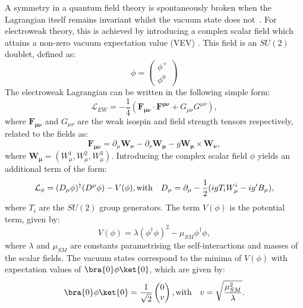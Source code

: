A symmetry in a quantum field theory is spontaneously broken when the Lagrangian
itself remains invariant whilst the vacuum state does
not~\cite{AitchisonGaugeTheories}. For electroweak
theory, this is achieved by introducing a complex scalar field which attains a
non-zero vacuum expectation value (VEV)
\cite{Higgs:1964ia,Higgs:1964pj,Guralnik:1964eu,Higgs:1966ev,Kibble:1967sv}. 
This field is an $SU(2)$ doublet, defined as:
\begin{equation}
\phi = \begin{pmatrix}\phi^{+} \\ \phi^{0} \end{pmatrix}
\end{equation}
The electroweak Lagrangian can be written in the following simple form:
\begin{equation}
\mathcal{L}_{EW} = -\frac{1}{4}(\mathbf{F_{\mu\nu}}\cdot\mathbf{F^{\mu\nu}} +
G_{\mu\nu}G^{\mu\nu}), 
\end{equation}
where $\mathbf{F_{\mu\nu}}$ and $G_{\mu\nu}$ are the weak isospin and field strength
tensors respectively, related to the fields as:
\begin{equation}
\mathbf{F_{\mu\nu}} = \partial_{\mu} \mathbf{W_{\nu}} - \partial_{\nu}\mathbf{W_{\mu}} -
g\mathbf{W_{\mu}} \times \mathbf{W_{\nu}} , 
\end{equation}
where $\mathbf{W_{\mu}}= (W_{\mu}^{1},W_{\mu}^{2},W_{\mu}^{3})$. Introducing the
complex scalar field $\phi$ yields an additional term of the form:
\begin{equation}
\mathcal{L_{\phi}} = (D_{\mu}\phi)^{\dagger}(D^{\mu}\phi) - V(\phi), \\ 
\text{with} \quad D_{\mu} = \partial_{\mu} - \frac{1}{2}(igT_{i}W_{\mu}^{i} - ig'B_{\mu}),
\end{equation}
where $T_{i}$ are the $SU(2)$ group generators. The term $V(\phi)$ is the
potential term, given by:
\begin{equation}
V(\phi) = \lambda(\phi^{\dagger}\phi)^{2} - \mu_{SM}\phi^{\dagger}\phi,
\end{equation}
where $\lambda$ and $\mu_{SM}$ are constants parametrising the self-interactions
and masses of the scalar fields. The vacuum states correspond to the minima of
$V(\phi)$ with expectation values of $\bra{0}\phi\ket{0}$, which are given by:
\begin{equation}
\bra{0}\phi\ket{0} = \frac{1}{\sqrt{2}} \begin{pmatrix}0 \\ v \end{pmatrix}, \\
\text{with} \quad v=\sqrt{\frac{\mu_{SM}^{2}}{\lambda}}.
\end{equation}
